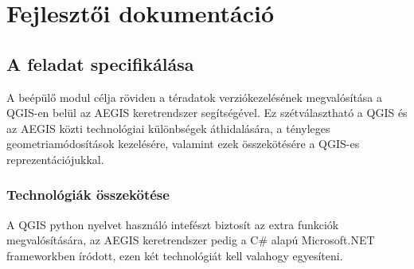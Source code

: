 \chapter{Fejlesztői dokumentáció}
\label{ch:impl}
\section{A feladat specifikálása}
A beépülő modul célja röviden a téradatok verziókezelésének megvalósítása a QGIS-en belül az AEGIS keretrendszer segítségével. Ez szétválasztható a QGIS és az AEGIS közti technológiai különbségek áthidalására, a tényleges geometriamódosítások kezelésére, valamint ezek összekötésére a QGIS-es reprezentációjukkal.
\subsection{Technológiák összekötése}
A QGIS python nyelvet használó intefészt biztosít az extra funkciók megvalósítására, az AEGIS keretrendszer pedig a C\# alapú Microsoft.NET frameworkben íródott, ezen két technológiát kell valahogy egyesíteni.
